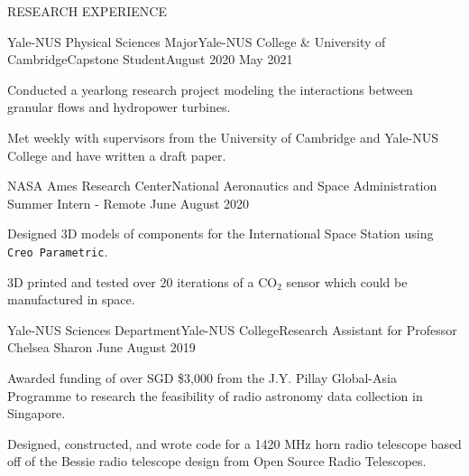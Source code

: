 \documentclass{resume} %
\begin{document}
\begin{rSection}{RESEARCH EXPERIENCE}

\begin{rSubsection}{Yale-NUS Physical Sciences Major}{Yale-NUS College \& University of Cambridge}{Capstone Student}{August 2020 {\textendash} May 2021}
\item Conducted a yearlong research project modeling the interactions between granular flows and hydropower turbines. 
\item Met weekly with supervisors from the University of Cambridge and Yale-NUS College and have written a draft paper.

\end{rSubsection}


\begin{rSubsection}{NASA Ames Research Center}{National Aeronautics and Space Administration} {Summer Intern - Remote} 
{June  {\textendash} August 2020}
\item  Designed 3D models of components for the International Space Station using \texttt{Creo Parametric}.
\item 3D printed and tested over 20 iterations of a $\text{CO}_2$ sensor which could be manufactured in space.

\end{rSubsection}

\begin{rSubsection}{Yale-NUS Sciences Department}{Yale-NUS College}{Research Assistant for Professor Chelsea Sharon}{  June  {\textendash} August 2019}
\item Awarded funding of over SGD \$3,000 from the J.Y. Pillay Global-Asia Programme to research the feasibility of radio astronomy data collection in Singapore. 

\item Designed, constructed, and wrote code for a 1420 MHz horn radio telescope based off of the Bessie radio telescope design from Open Source Radio Telescopes. 


\end{rSubsection}
\end{rSection}
\end{document}
